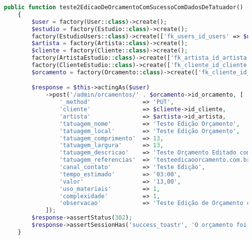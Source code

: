 \begin{lstlisting}[language=PHP, caption= Scripts de teste de Edição de Orçamentos, nolol,
label={code:EdicaoDeOrcamentoTest}]
    public function teste2EdicaoDeOrcamentoComSucessoComDadosDeTatuador()
    {
        $user = factory(User::class)->create();
        $estudio = factory(Estudio::class)->create();
        factory(EstudioUsers::class)->create(['fk_users_id_users' => $user->id, 'fk_estudio_id_estudio' => $estudio->id_estudio]);
        $artista = factory(Artista::class)->create();
        $cliente = factory(Cliente::class)->create();
        factory(ArtistaEstudio::class)->create(['fk_artista_id_artista' => $artista->id_artista, 'fk_estudio_id_estudio' => $estudio->id_estudio]);
        factory(ClienteEstudio::class)->create(['fk_cliente_id_cliente' => $cliente->id_cliente, 'fk_estudio_id_estudio' => $estudio->id_estudio]);
        $orcamento = factory(Orcamento::class)->create(['fk_cliente_id_cliente' => $cliente->id_cliente, 'fk_artista_id_artista' => $artista->id_artista, 'fk_estudio_id_estudio' => $estudio->id_estudio, 'fk_orcamento_status_id_orcamento_status' => 1]);

        $response = $this->actingAs($user)
            ->post('/admin/orcamentos/' . $orcamento->id_orcamento, [
                '_method'               => 'PUT',
                'cliente'               => $cliente->id_cliente,
                'artista'               => $artista->id_artista,
                'tatuagem_nome'         => 'Teste Edição Orçamento',
                'tatuagem_local'        => 'Teste Edição Orçamento',
                'tatuagem_comprimento'  => 13,
                'tatuagem_largura'      => 13,
                'tatuagem_descricao'    => 'Teste Orçamento Editado com Sucesso!',
                'tatuagem_referencias'  => 'testeedicaoorcamento.com.br',
                'canal_contato'         => 'Teste Edição',
                'tempo_estimado'        => '03:00',
                'valor'                 => '13,00',
                'uso_materiais'         => 1,
                'complexidade'          => 1,
                'observacao'            => 'Teste Edição de Orçamento com sucesso com dados de tatuador!'
            ]);
        $response->assertStatus(302);
        $response->assertSessionHas('success_toastr', 'O orçamento foi atualizado com sucesso!');
    }


\end{lstlisting}
